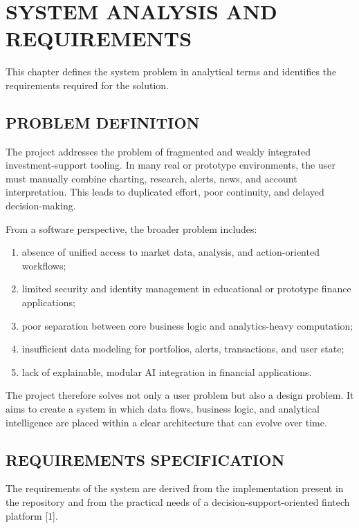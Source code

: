 \documentclass[12pt,a4paper]{report}
\begin{document}
\chapter{SYSTEM ANALYSIS AND REQUIREMENTS}
This chapter defines the system problem in analytical terms and identifies the requirements required for the solution.

\section{PROBLEM DEFINITION}
The project addresses the problem of fragmented and weakly integrated investment-support tooling. In many real or prototype environments, the user must manually combine charting, research, alerts, news, and account interpretation. This leads to duplicated effort, poor continuity, and delayed decision-making.

From a software perspective, the broader problem includes:
\begin{enumerate}[label=\arabic*.]
\item absence of unified access to market data, analysis, and action-oriented workflows;
\item limited security and identity management in educational or prototype finance applications;
\item poor separation between core business logic and analytics-heavy computation;
\item insufficient data modeling for portfolios, alerts, transactions, and user state;
\item lack of explainable, modular AI integration in financial applications.
\end{enumerate}

The project therefore solves not only a user problem but also a design problem. It aims to create a system in which data flows, business logic, and analytical intelligence are placed within a clear architecture that can evolve over time.

\section{REQUIREMENTS SPECIFICATION}
The requirements of the system are derived from the implementation present in the repository and from the practical needs of a decision-support-oriented fintech platform [1].
\end{document}
